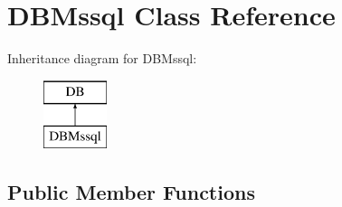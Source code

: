 \hypertarget{classDBMssql}{}\section{D\+B\+Mssql Class Reference}
\label{classDBMssql}
Inheritance diagram for D\+B\+Mssql\+:\begin{figure}[H]
\begin{center}
\leavevmode
\includegraphics[height=2.000000cm]{classDBMssql}
\end{center}
\end{figure}
\subsection*{Public Member Functions}
